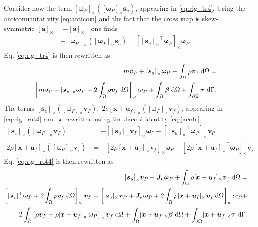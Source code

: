 \documentclass{svjour3}                     %
\newcommand{\crmat}[1]{\ensuremath{[#1]_{\times}}}
\begin{document}
Consider now the term $\crmat{\bm{\omega}_P} (\crmat{\bm{\omega}_P} \bm{s}_u)$, appearing in \eqref{eq:rig_tr4}. Using the anticommutativity \eqref{eq:anticom} and the fact that the cross map is skew-symmetric $\crmat{\bm{a}} = -\crmat{\bm{a}}^\top$ one finds
\begin{align*}
-\crmat{\bm{\omega}_P} (\crmat{\bm{\omega}_P} \bm{s}_u) = \crmat{\crmat{\bm{s}_u}^\top\bm{\omega}_{P}} \bm{\omega}_{P}.
\end{align*}
Eq. \eqref{eq:rig_tr4} is then rewritten as
\begin{equation}
\label{eq:rig_tr5}
\begin{split}
m\dot{\bm{v}}_P + \crmat{\bm{s}_u}^\top \dot{\bm{\omega}}_P +   \int_{\Omega} \rho \dot{\bm{v}}_f \d{\Omega}  = \\
\left[m \bm{v}_P + \crmat{\bm{s}_u}^\top \bm\omega_P +2 \int_{\Omega} \rho \bm{v}_f \d{\Omega} \right]_\times \bm\omega_P +  \int_{\Omega} \bm\beta \d{\Omega} + \int_{\partial \Omega} \bm\tau \d{\Gamma}.
\end{split}
\end{equation}
The terms $\crmat{\bm{s}_u} (\crmat{\bm{\omega}_P} \bm{v}_P), \; 2\rho \crmat{\bm{x}+\bm{u}_f} (\crmat{\bm\omega_P} {\bm{v}}_f)$, appearing in \eqref{eq:rig_rot4} can be rewritten using the Jacobi identity \eqref{eq:jacobi}
\begin{align}
\crmat{\bm{s}_u} (\crmat{\bm{\omega}_P} \bm{v}_P) &= - \crmat{\crmat{\bm{s}_u} \bm{v}_P} \bm{\omega}_P - \crmat{\crmat{\bm{s}_u}^\top \bm{\omega}_P} \bm{v}_P, \\
2\rho \crmat{\bm{x}+\bm{u}_f} (\crmat{\bm\omega_P} {\bm{v}}_f) &= - \crmat{2\rho \crmat{\bm{x}+\bm{u}_f} \bm{v}_f} \bm\omega_P - \crmat{2\rho \crmat{\bm{x}+\bm{u}_f}^\top \bm\omega_P} \bm{v}_f
\end{align}
Eq. \eqref{eq:rig_rot4} is then rewritten as
\begin{equation}
\label{eq:rig_rot5}
\begin{split}
\crmat{\bm{s}_u} \dot{\bm{v}}_P  + \bm{J}_u \dot{\bm\omega}_P + \int_{\Omega} \rho \crmat{\bm{x}+\bm{u}_f} \dot{\bm{v}}_f \d{\Omega} = \\
\left[\crmat{\bm{s}_u}^\top \bm\omega_P + 2 \int_{\Omega} \rho \bm{v}_f \d{\Omega} \right]_\times \bm{v}_P + \left[\crmat{\bm{s}_u} \bm{v}_P + \bm{J}_u \bm\omega_P + 2 \int_{\Omega} \rho \crmat{\bm{x}+\bm{u}_f} {\bm{v}}_f \d{\Omega} \right]_\times \bm\omega_P + 
\\
2 \int_{\Omega} \left[\rho \bm{v}_P + \rho \crmat{\bm{x}+\bm{u}_f}^\top \, \bm\omega_P \right]_\times \bm{v}_f \d{\Omega} + \int_{\Omega}\crmat{\bm{x}+\bm{u}_f} \bm\beta \d{\Omega} + \int_{\partial \Omega}\crmat{\bm{x}+\bm{u}_f} \bm{\tau} \d{\Gamma}.
\end{split}
\end{equation}
\end{document}
